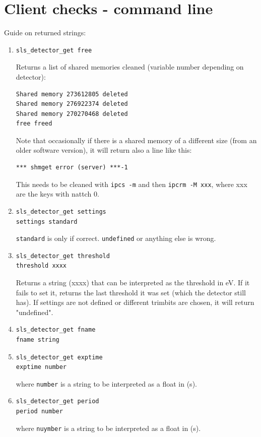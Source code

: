 \documentclass{article}
\begin{document}
\section{Client checks - command line}

Guide on returned strings:
\begin{enumerate}
\item \begin{verbatim}
sls_detector_get free
\end{verbatim}
Returns a list of shared memories cleaned (variable number depending on detector):
\begin{verbatim}
Shared memory 273612805 deleted
Shared memory 276922374 deleted
Shared memory 270270468 deleted
free freed
\end{verbatim}
Note that occasionally if there is a shared memory of a different size (from an older software version), it will return also a line like this:
\begin{verbatim}
*** shmget error (server) ***-1
\end{verbatim}
This needs to be cleaned with {\tt{ipcs -m}} and then {\tt{ipcrm -M xxx}}, where xxx are the keys with nattch 0. 
\item \begin{verbatim}sls_detector_get settings
settings standard
\end{verbatim} 
{\tt{standard}} is only if correct. {\tt{undefined}} or anything else is wrong. 

\item \begin{verbatim}
sls_detector_get threshold
threshold xxxx
\end{verbatim}
Returns a string (xxxx) that can be interpreted as the threshold in eV. If it fails to set it, returns the last threshold it was set (which the detector still has). If settings are not defined or different trimbits are chosen, it will return "undefined".

\item \begin{verbatim}
sls_detector_get fname
fname string
\end{verbatim}

\item \begin{verbatim}
sls_detector_get exptime
exptime number
\end{verbatim}
where {\tt{number}} is a string to be interpreted as a float in (s). 

\item \begin{verbatim}
sls_detector_get period
period number
\end{verbatim}
where {\tt{nuymber}} is a string to be interpreted as a float in (s). 


\end{enumerate}
\end{document}

